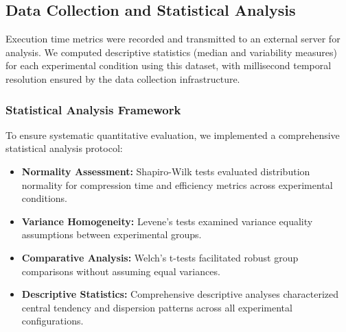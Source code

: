 \documentclass[conference]{IEEEtran}
\begin{document}
	\subsection{Data Collection and Statistical Analysis}
	\label{data-collection-and-storage}
	
	Execution time metrics were recorded and transmitted to an external server for analysis. We computed descriptive statistics (median and variability measures) for each experimental condition using this dataset, with millisecond temporal resolution ensured by the data collection infrastructure.
	
	\subsubsection{Statistical Analysis Framework}
	To ensure systematic quantitative evaluation, we implemented a comprehensive statistical analysis protocol:
	
	\begin{itemize}
		\item \textbf{Normality Assessment:} Shapiro-Wilk tests evaluated distribution normality for compression time and efficiency metrics across experimental conditions.
		\item \textbf{Variance Homogeneity:} Levene's tests examined variance equality assumptions between experimental groups.
		\item \textbf{Comparative Analysis:} Welch's t-tests facilitated robust group comparisons without assuming equal variances.
		\item \textbf{Descriptive Statistics:} Comprehensive descriptive analyses characterized central tendency and dispersion patterns across all experimental configurations.
	\end{itemize}
	
	
	
\end{document}
